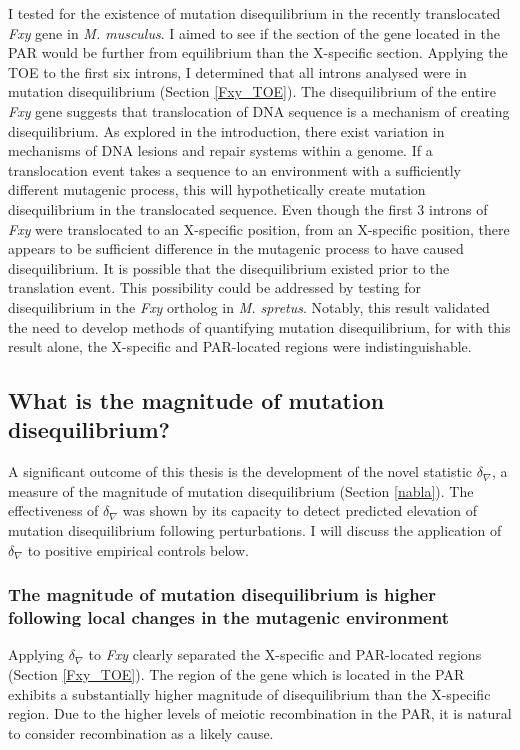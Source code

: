 I tested for the existence of mutation disequilibrium in the recently translocated \textit{Fxy} gene in \textit{M. musculus}. I aimed to see if the section of the gene located in the PAR would be further from equilibrium than the X-specific section. Applying the TOE to the first six introns, I determined that all introns analysed were in mutation disequilibrium (Section \ref{Fxy_TOE}). The disequilibrium of the entire \textit{Fxy} gene suggests that translocation of DNA sequence is a mechanism of creating disequilibrium. As explored in the introduction, there exist variation in mechanisms of DNA lesions and repair systems within a genome. If a translocation event takes a sequence to an environment with a sufficiently different mutagenic process, this will hypothetically create mutation disequilibrium in the translocated sequence. Even though the first 3 introns of \textit{Fxy} were translocated to an X-specific position, from an X-specific position, there appears to be sufficient difference in the mutagenic process to have caused disequilibrium. It is possible that the disequilibrium existed prior to the translation event. This possibility could be addressed by testing for disequilibrium in the \textit{Fxy} ortholog in \textit{M. spretus}. Notably, this result validated the need to develop methods of quantifying mutation disequilibrium, for with this result alone, the X-specific and PAR-located regions were indistinguishable.

\subsection{What is the magnitude of mutation disequilibrium?}

A significant outcome of this thesis is the development of the novel statistic $\delta_\nabla$, a measure of the magnitude of mutation disequilibrium (Section \ref{nabla}). The effectiveness of $\delta_\nabla$ was shown by its capacity to detect predicted elevation of mutation disequilibrium following perturbations. I will discuss the application of $\delta_\nabla$ to positive empirical controls below.  

\subsubsection{The magnitude of mutation disequilibrium is higher following local changes in the mutagenic environment}

Applying $\delta_\nabla$ to \textit{Fxy} clearly separated the X-specific and PAR-located regions (Section \ref{Fxy_TOE}). The region of the gene which is located in the PAR exhibits a substantially higher magnitude of disequilibrium than the X-specific region. Due to the higher levels of meiotic recombination in the PAR, it is natural to consider recombination as a likely cause. 

